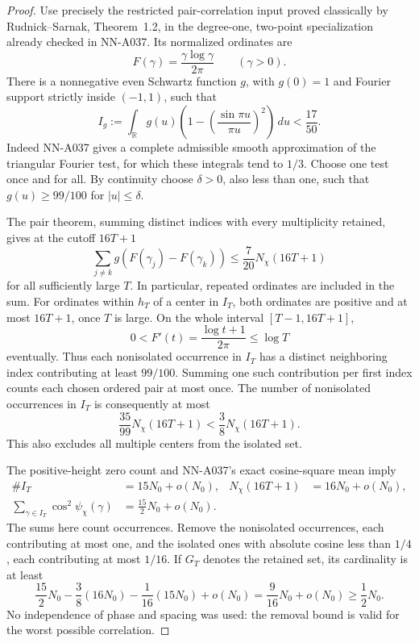 \begin{proof}
Use precisely the restricted pair-correlation input proved
classically by Rudnick--Sarnak, Theorem~1.2, in the degree-one,
two-point specialization already checked in NN-A037.
Its normalized ordinates are
\[
          F(\gamma)=\frac{\gamma\log\gamma}{2\pi}
                  \qquad(\gamma>0).
\]
There is a nonnegative even Schwartz function \(g\), with
\(g(0)=1\) and Fourier support strictly inside \((-1,1)\),
such that
\[
 I_g:=\int_{\mathbb R}g(u)
       \left(1-\left(\frac{\sin\pi u}{\pi u}\right)^2\right)\,du
                              <\frac{17}{50}.
\]
Indeed NN-A037 gives a complete admissible smooth
approximation of the triangular Fourier test, for which
these integrals tend to \(1/3\). Choose one test once and for
all. By continuity choose \(\delta>0\), also less than one,
such that \(g(u)\ge99/100\) for \(|u|\le\delta\).

The pair theorem, summing distinct indices with every
multiplicity retained, gives at the cutoff \(16T+1\)
\[
 \sum_{j\ne k}g(F(\gamma_j)-F(\gamma_k))
                  \le\frac7{20}N_\chi(16T+1)
\]
for all sufficiently large \(T\). In particular, repeated
ordinates are included in the sum. For ordinates within
\(h_T\) of a center in \(I_T\), both ordinates are positive
and at most \(16T+1\), once \(T\) is large. On the whole
interval \([T-1,16T+1]\),
\[
              0<F'(t)=\frac{\log t+1}{2\pi}\le\log T
\]
eventually. Thus each nonisolated occurrence in \(I_T\)
has a distinct neighboring index contributing at least
\(99/100\). Summing one such contribution per first index
counts each chosen ordered pair at most once. The number
of nonisolated occurrences in \(I_T\) is consequently at most
\[
 \frac{35}{99}N_\chi(16T+1)
                         <\frac38N_\chi(16T+1).
\]
This also excludes all multiple centers from the isolated set.

The positive-height zero count and NN-A037's exact cosine-square
mean imply
\[
 \begin{aligned}
 \# I_T&=15N_0+o(N_0),&
 N_\chi(16T+1)&=16N_0+o(N_0),\\
 \sum_{\gamma\in I_T}\cos^2\psi_\chi(\gamma)
                         &=\frac{15}{2}N_0+o(N_0).
 \end{aligned}
\]
The sums here count occurrences. Remove the nonisolated
occurrences, each contributing at most one, and the isolated
ones with absolute cosine less than \(1/4\), each contributing
at most \(1/16\). If \(G_T\) denotes the retained set, its
cardinality is at least
\[
 \frac{15}{2}N_0-\frac38(16N_0)-\frac1{16}(15N_0)
                  +o(N_0)
          =\frac9{16}N_0+o(N_0)\ge\frac12N_0.
\]
No independence of phase and spacing was used: the removal
bound is valid for the worst possible correlation.
\end{proof}


